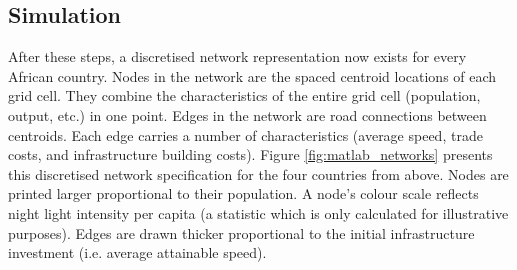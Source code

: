 \documentclass[11pt, oneside]{article}   	%
\begin{document}
\subsection{Simulation}

After these steps, a discretised network representation now exists for every African country. Nodes in the network are the spaced centroid locations of each grid cell. They combine the characteristics of the entire grid cell (population, output, etc.) in one point. Edges in the network are road connections between centroids. Each edge carries a number of characteristics (average speed, trade costs, and infrastructure building costs). Figure \eqref{fig:matlab_networks} presents this discretised network specification for the four countries from above. Nodes are printed larger proportional to their population. A node's colour scale reflects night light intensity per capita (a statistic which is only calculated for illustrative purposes). Edges are drawn thicker proportional to the initial infrastructure investment (i.e. average attainable speed).
\end{document}
